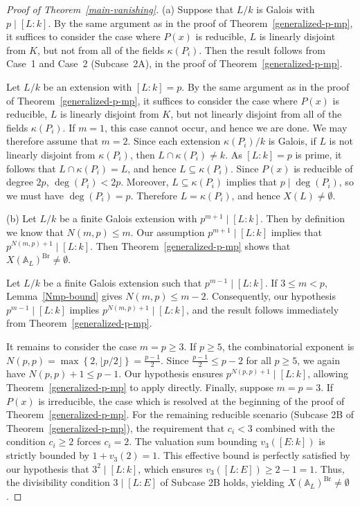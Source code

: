\documentclass[10pt]{amsart}
\theoremstyle{plain}
\theoremstyle{definition}
\newcommand{\A}{{\mathbb A}}
\newcommand{\Br}{\operatorname{Br}}
\begin{document}
\begin{proof}[Proof of Theorem~\ref{main-vanishing}]

(a) Suppose that $L/k$ is Galois with $p\mid[L:k]$. By the same argument as in the proof of Theorem~\ref{generalized-p-mp}, it suffices to consider the case where $P(x)$ is reducible, $L$ is linearly disjoint from $K$, but not from all of the fields $\kappa(P_i)$. Then the result follows from Case~1 and Case~2 (Subcase~2A), in the proof of Theorem~\ref{generalized-p-mp}.


Let \(L/k\) be an extension with \([L:k]=p\). By the same argument as in the
proof of Theorem~\ref{generalized-p-mp}, it suffices to consider the case where
\(P(x)\) is reducible, \(L\) is linearly disjoint from \(K\), but not linearly
disjoint from all of the fields \(\kappa(P_i)\). If \(m=1\), this case cannot
occur, and hence we are done. We may therefore assume that \(m=2\). Since each extension \(\kappa(P_i)/k\) is Galois, if \(L\) is not linearly
disjoint from \(\kappa(P_i)\), then \(L\cap \kappa(P_i)\neq k\). As
\([L:k]=p\) is prime, it follows that \(L\cap \kappa(P_i)=L\), and hence
\(L\subseteq \kappa(P_i)\). Since \(P(x)\) is reducible of degree \(2p\), \(\deg(P_i)<2p\). Moreover, \(L\subseteq \kappa(P_i)\) implies that \(p\mid \deg(P_i)\), so we
must have \(\deg(P_i)=p\). Therefore \(L=\kappa(P_i)\), and hence
\(X(L)\neq\emptyset\).


(b) Let $L/k$ be a finite Galois extension with $p^{m+1} \mid [L:k]$. Then by definition we know that $N(m, p) \le m$. Our assumption $p^{m+1} \mid [L:k]$ implies that $p^{N(m,p)+1} \mid [L:k]$. Then Theorem~\ref{generalized-p-mp} shows that $X(\A_L)^{\Br} \neq \emptyset$.

Let $L/k$ be a finite Galois extension such that $p^{m-1} \mid [L:k]$. If $3 \le m < p$, Lemma~\ref{Nmp-bound} gives $N(m, p) \le m-2$. Consequently, our hypothesis $p^{m-1} \mid [L:k]$ implies $p^{N(m,p)+1} \mid [L:k]$, and the result follows immediately from Theorem~\ref{generalized-p-mp}. 

It remains to consider the case $m = p \ge 3$. If $p \ge 5$, the combinatorial exponent is $N(p,p) = \max\left\{2, \lfloor p/2 \rfloor\right\} = \frac{p-1}{2}$. Since $\frac{p-1}{2} \le p-2$ for all $p \ge 5$, we again have $N(p,p) + 1 \le p - 1$. Our hypothesis ensures $p^{N(p,p)+1} \mid [L:k]$, allowing Theorem~\ref{generalized-p-mp} to apply directly. Finally, suppose $m = p = 3$. If $P(x)$ is irreducible, the case which is resolved at the beginning of the proof of Theorem~\ref{generalized-p-mp}. For the remaining reducible scenario (Subcase 2B of Theorem~\ref{generalized-p-mp}),  the requirement that $c_i < 3$ combined with the condition $c_i \ge 2$ forces $c_i = 2$. The valuation sum bounding $v_3([E:k])$ is strictly bounded by $1 + v_3(2) = 1$. This effective bound is perfectly satisfied by our hypothesis that $3^2 \mid [L:k]$, which ensures $v_3([L:E]) \ge 2 - 1 = 1$. Thus, the divisibility condition $3 \mid [L:E]$ of Subcase 2B holds, yielding $X(\A_L)^{\Br} \neq \emptyset$.\end{proof}
\end{document}

